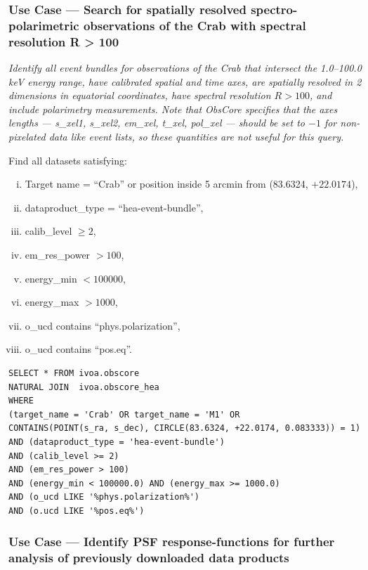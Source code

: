 \subsubsection{Use Case --- Search for spatially resolved spectro-polarimetric observations of the Crab with spectral resolution R > 100}

{\em Identify all event bundles for observations of the Crab that intersect the 1.0--100.0 keV energy range, have calibrated spatial and time axes, are spatially resolved in 2 dimensions in equatorial coordinates, have spectral resolution $R>100$, and include polarimetry measurements.  Note that ObsCore specifies that the axes lengths --- {\em s\_xel1, s\_xel2, em\_xel, t\_xel, pol\_xel} --- should be set to $-1$ for non-pixelated data like event lists, so these quantities are not useful for this query.\/}


\medskip
\noindent Find all datasets satisfying:
\begin{enumerate}[(i)]
  \item Target name = ``Crab'' or position inside 5 arcmin from (83.6324, $+22.0174$),
  \item dataproduct\_type = ``hea-event-bundle'',
  \item calib\_level $\geq 2$,
  \item em\_res\_power $> 100$,
  \item energy\_min $< 100000$,
  \item energy\_max $> 1000$,
  \item o\_ucd contains ``phys.polarization'',
  \item o\_ucd contains ``pos.eq''.
\end{enumerate}

\begin{verbatim}
SELECT * FROM ivoa.obscore
NATURAL JOIN  ivoa.obscore_hea
WHERE
(target_name = 'Crab' OR target_name = 'M1' OR
CONTAINS(POINT(s_ra, s_dec), CIRCLE(83.6324, +22.0174, 0.083333)) = 1)
AND (dataproduct_type = 'hea-event-bundle')
AND (calib_level >= 2)
AND (em_res_power > 100)
AND (energy_min < 100000.0) AND (energy_max >= 1000.0)
AND (o_ucd LIKE '%phys.polarization%')
AND (o.ucd LIKE '%pos.eq%')
\end{verbatim}


\subsubsection{Use Case --- Identify PSF response-functions for further analysis of previously downloaded data products}

